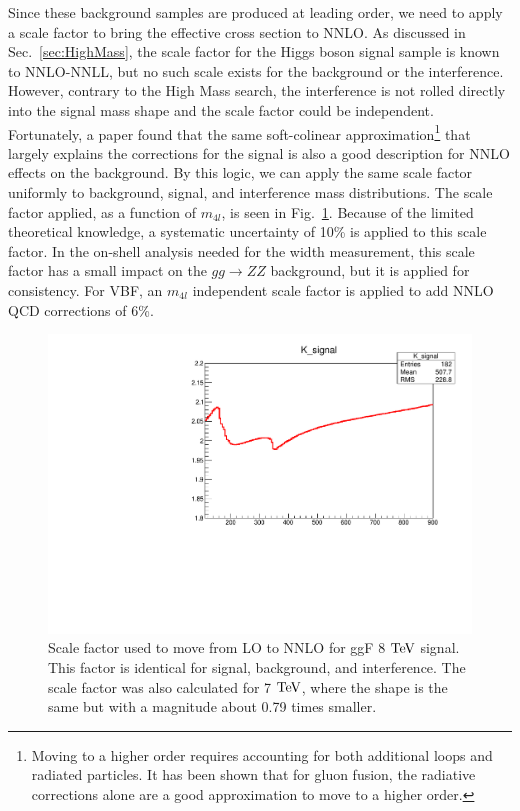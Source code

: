 Since these background samples are produced at leading order, we need to apply a scale factor to bring the effective cross section to NNLO. As discussed in Sec.~\ref{sec:HighMass}, the scale factor for the Higgs boson signal sample is known to NNLO-NNLL, but no such scale exists for the background or the interference. However, contrary to the High Mass search, the interference is not rolled directly into the signal mass shape and the scale factor could be independent. Fortunately, a paper \cite{} found that the same soft-colinear approximation\footnote{Moving to a higher order requires accounting for both additional loops and radiated particles. It has been shown \cite{} that for gluon fusion, the radiative corrections alone are a good approximation to move to a higher order.} that largely explains the corrections for the signal is also a good description for NNLO effects on the background. By this logic, we can apply the same scale factor uniformly to background, signal, and interference mass distributions. The scale factor applied, as a function of $m_{4l}$, is seen in Fig.~\ref{fig:KFactorggF}. Because of the limited theoretical knowledge, a systematic uncertainty of 10\% is applied to this scale factor. In the on-shell analysis needed for the width measurement, this scale factor has a small impact on the $gg\rightarrow ZZ$ background, but it is applied for consistency. For VBF, an $m_{4l}$ independent scale factor is applied to add NNLO QCD corrections of 6\%.

\begin{figure}[htbp]
\begin{center}
\includegraphics[width=.5\linewidth]{HiggsProperties/figures/kfactorpassa.pdf}
\caption[NNLO/LO Scale Factor at 8 $\rm{TeV}$ for ggF Signal]{Scale factor used to move from LO to NNLO for ggF 8 $\rm{TeV}$ signal. This factor is identical for signal, background, and interference. The scale factor was also calculated for 7 $\rm{TeV}$, where the shape is the same but with a magnitude about 0.79 times smaller.}
\label{fig:KFactorggF}
\end{center}
\end{figure}


